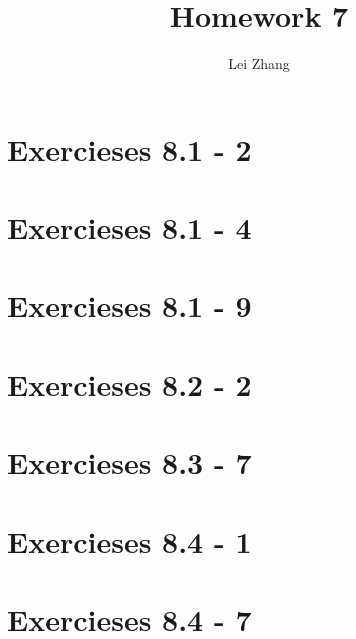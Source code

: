 \documentclass{article}
\title{Homework 7}
\author{Lei Zhang}
\begin{document}
\maketitle

\section{Exercieses 8.1 - 2}



\section{Exercieses 8.1 - 4}

\section{Exercieses 8.1 - 9}

\section{Exercieses 8.2 - 2}

\section{Exercieses 8.3 - 7}

\section{Exercieses 8.4 - 1}

\section{Exercieses 8.4 - 7}
\end{document}
